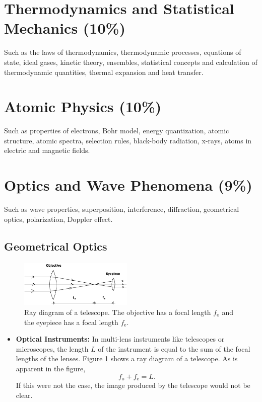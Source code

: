 \documentclass[%
 reprint,
superscriptaddress,
 amsmath,amssymb,
 aps,
prc,
]{revtex4-1}
\begin{document}
\section{Thermodynamics and Statistical Mechanics (10\%)}
Such as the laws of thermodynamics, thermodynamic processes, equations of state, ideal gases, kinetic theory, ensembles, statistical concepts and calculation of thermodynamic quantities, thermal expansion and heat transfer.

\section{Atomic Physics (10\%)}
Such as properties of electrons, Bohr model, energy quantization, atomic structure, atomic spectra, selection rules, black-body radiation, x-rays, atoms in electric and magnetic fields.

\section{Optics and Wave Phenomena (9\%)}
Such as wave properties, superposition, interference, diffraction, geometrical optics, polarization, Doppler effect.

\subsection{Geometrical Optics}

\begin{figure}[t]
	\centering
	\includegraphics[width=0.48\textwidth]{figures/telescope}
	\caption{Ray diagram of a telescope. The objective has a focal length $f_\text{o}$ and the eyepiece has a focal length $f_\text{e}$. }
	\label{fig:telescope}
\end{figure}

\begin{itemize}
	\item \textbf{Optical Instruments:} In multi-lens instruments like telescopes or microscopes, the length $L$ of the instrument is equal to the sum of the focal lengths of the lenses. Figure \ref{fig:telescope} shows a ray diagram of a telescope. As is apparent in the figure,
	\begin{equation}
		f_\text{o} + f_\text{e} = L.
	\end{equation}
	If this were not the case, the image produced by the telescope would not be clear.
\end{itemize}
\end{document}
